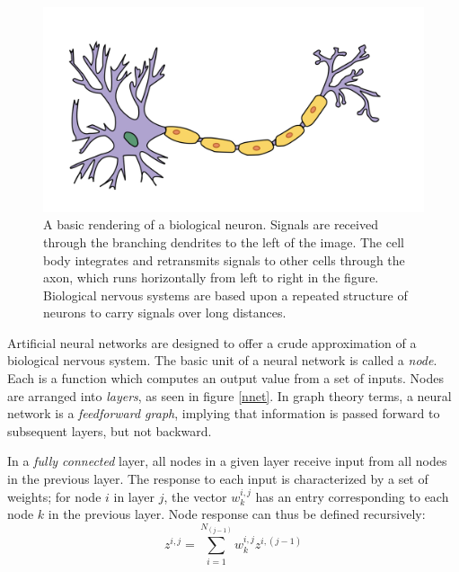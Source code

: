 \begin{figure}[t]
  \begin{center}
    \includegraphics[width=\textwidth]{figures/figures/neuron.png}
  \end{center}
  \caption[A basic rendering of a biological neuron]{A basic rendering of a biological neuron.  Signals are received through the branching dendrites to the left of the image.  The cell body integrates and retransmits signals to other cells through the axon, which runs horizontally from left to right in the figure.  Biological nervous systems are based upon a repeated structure of neurons to carry signals over long distances.}

  \label{neuron}
\end{figure}








Artificial neural networks are designed to offer a crude approximation of a biological nervous system.  The basic unit of a neural network is called a \textit{node}.  Each is a function which computes an output value from a set of inputs.  Nodes are arranged into \textit{layers}, as seen in figure \ref{nnet}.  In graph theory terms, a neural network is a \textit{feedforward graph}, implying that information is passed forward to subsequent layers, but not backward.


In a \textit{fully connected} layer, all nodes in a given layer receive input from all nodes in the previous layer.  The response to each input is characterized by a set of weights; for node $i$ in layer $j$, the vector $w_{k}^{i,j}$ has an entry corresponding to each node $k$ in the previous layer.  Node response can thus be defined recursively:
\begin{equation}
z^{i,j} = \sum_{i=1}^{N_{(j-1)}} w_{k}^{i,j} z^{i,(j-1)}
\end{equation}









